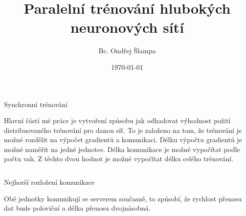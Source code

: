 \documentclass{beamer}
\title[]{Paralelní trénování hlubokých neuronových sítí}
\author[]{Bc. Ondřej Šlampa}
\institute[]{Fakulta informačních technologií}
\date{\today}
\begin{document}
\begin{frame}{}



\begin{beamercolorbox}{}
\maketitle
\end{beamercolorbox}

\begin{block}{Synchronní trénování}

Hlavní částí mé práce je vytvoření způsobu jak odhadovat výhodnost požití distribuovaného trénování pro danou síť.
To je založeno na tom, že trénování je možné rozdělit na výpočet gradientů a komunikaci.
Délku výpočtu gradientů je možné naměřit na jedné jednotce.
Délka komunikace je možné vypočítat podle počtu vah.
Z těchto dvou hodnot je možné vypočítat délku celého trénování.

\begin{columns}[t]

\begin{column}{0.48\linewidth}
\begin{block}{Nejhorší rozložení komunikace}

Obě jednotky komunikují se serverem současně, to způsobí, že rychlost přenosu dat bude poloviční a délka přenosu dvojnásobná.


\end{block}
\end{column}
\end{columns}
\end{block}
\end{frame}
\end{document}
